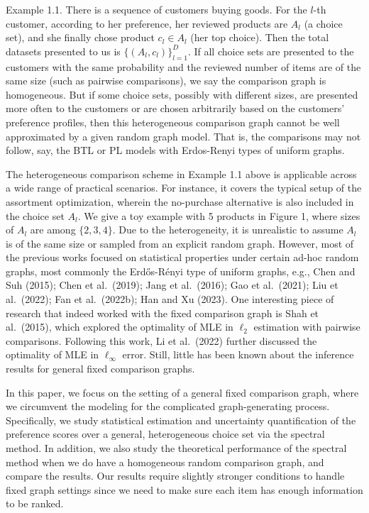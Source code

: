 Example 1.1. There is a sequence of customers buying goods. For the \(l\)-th customer, according to her preference, her reviewed products are \(A_{l}\) (a choice set), and she finally chose product \(c_{l}\in A_{l}\) (her top choice). Then the total datasets presented to us is \(\{(A_l,c_l)\}_{l = 1}^D\). If all choice sets are presented to the customers with the same probability and the reviewed number of items are of the same size (such as pairwise comparisons), we say the comparison graph is homogeneous. But if some choice sets, possibly with different sizes, are presented more often to the customers or are chosen arbitrarily based on the customers' preference profiles, then this heterogeneous comparison graph cannot be well approximated by a given random graph model. That is, the comparisons may not follow, say, the BTL or PL models with Erdos-Renyi types of uniform graphs.

The heterogeneous comparison scheme in Example 1.1 above is applicable across a wide range of practical scenarios. For instance, it covers the typical setup of the assortment optimization,
wherein the no-purchase alternative is also included in the choice set \(A_{l}\). We give a toy example with 5 products in Figure 1, where sizes of \(A_{l}\) are among \(\{2,3,4\}\). Due to the heterogeneity, it is unrealistic to assume \(A_{l}\) is of the same size or sampled from an explicit random graph. However, most of the previous works focused on statistical properties under certain ad-hoc random graphs, most commonly the Erdős-Rényi type of uniform graphs, e.g., Chen and Suh (2015); Chen et al.~(2019); Jang et al.~(2016); Gao et al.~(2021); Liu et al.~(2022); Fan et al.~(2022b); Han and Xu (2023). One interesting piece of research that indeed worked with the fixed comparison graph is Shah et al.~(2015), which explored the optimality of MLE in \(\ell_{2}\) estimation with pairwise comparisons. Following this work, Li et al.~(2022) further discussed the optimality of MLE in \(\ell_{\infty}\) error. Still, little has been known about the inference results for general fixed comparison graphs.

In this paper, we focus on the setting of a general fixed comparison graph, where we circumvent the modeling for the complicated graph-generating process. Specifically, we study statistical estimation and uncertainty quantification of the preference scores over a general, heterogeneous choice set via the spectral method. In addition, we also study the theoretical performance of the spectral method when we do have a homogeneous random comparison graph, and compare the results. Our results require slightly stronger conditions to handle fixed graph settings since we need to make sure each item has enough information to be ranked.


